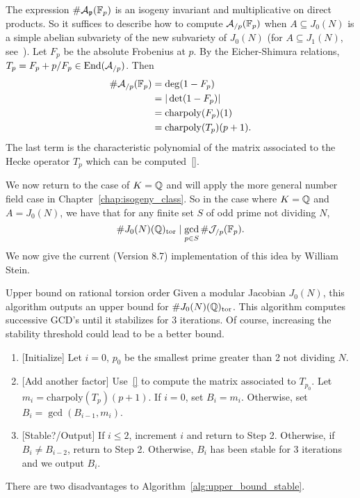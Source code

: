 The expression $\#\mathcal{A}_{\mathfrak{p}}(\mathbb{F}_p)$ is an isogeny invariant and
multiplicative on direct products. So it suffices to describe how to compute
$\mathcal{A}_{/p}(\mathbb{F}_p)$ when $A\subseteq J_0(N)$ is a simple abelian subvariety
of the new subvariety of $J_0(N)$ (for $A\subseteq J_1(N)$, see~\cite[\S
3.5]{agashe-stein:bsd}). Let $F_p$ be the absolute Frobenius at $p$. By the
Eicher-Shimura relations, $T_p = F_p + p/F_p\in \operatorname{End}(\mathcal{A}_{/p})$. Then
\begin{align}
    \label{eq:katz_bound}
    \begin{split}
    \#\mathcal{A}_{/p}(\mathbb{F}_p)
    & = \deg(1-F_p) \\
    & = |\det(1-F_p)| \\
    & = \mathrm{charpoly}(F_p)(1) \\
    & = \mathrm{charpoly}(T_p)(p+1).
    \end{split}
\end{align}
The last term is the characteristic polynomial of the matrix associated to the
Hecke operator $T_p$ which can be computed~\ref{}.

We now return to the case of $K=\mathbb{Q}$ and will apply the more general number
field case in Chapter~\ref{chap:isogeny_class}. So in the case where $K=\mathbb{Q}$
and $A=J_0(N)$, we have that for any finite set $S$ of odd prime not dividing
$N$,
\[
    \# J_0(N)(\mathbb{Q})_{\mathrm{tor}} \mid \gcd_{p\in S} \#\mathcal{J}_{/p}(\mathbb{F}_p).
\]
We now give the current \sage (Version 8.7) implementation of this idea by
William Stein.
\begin{algorithm}{Upper bound on rational torsion order}%
    \label{alg:upper_bound_stable}
    Given a modular Jacobian $J_0(N)$, this algorithm outputs an upper bound
    for $\# J_0(N)(\mathbb{Q})_{\mathrm{tor}}$. This algorithm computes successive GCD's until
    it stabilizes for 3 iterations. Of course, increasing the stability
    threshold could lead to be a better bound.
    \begin{enumerate}
        \item{} [Initialize]
            Let $i=0$, $p_0$ be the smallest prime greater than 2 not dividing
            $N$.
        \item{} [Add another factor]
            Use~\ref{} to compute the matrix associated to $T_{p_0}$. Let $m_i
            = \mathrm{charpoly}(T_p)(p+1)$. If $i=0$, set $B_i=m_i$. Otherwise,
            set $B_i=\gcd(B_{i-1}, m_i)$.
        \item{} [Stable?/Output]
            If $i\leq 2$, increment $i$ and return to Step 2. Otherwise, if
            $B_i\neq B_{i-2}$, return to Step 2. Otherwise, $B_i$ has been
            stable for 3 iterations and we output $B_i$.
    \end{enumerate}
\end{algorithm}
There are two disadvantages to Algorithm~\ref{alg:upper_bound_stable}.

